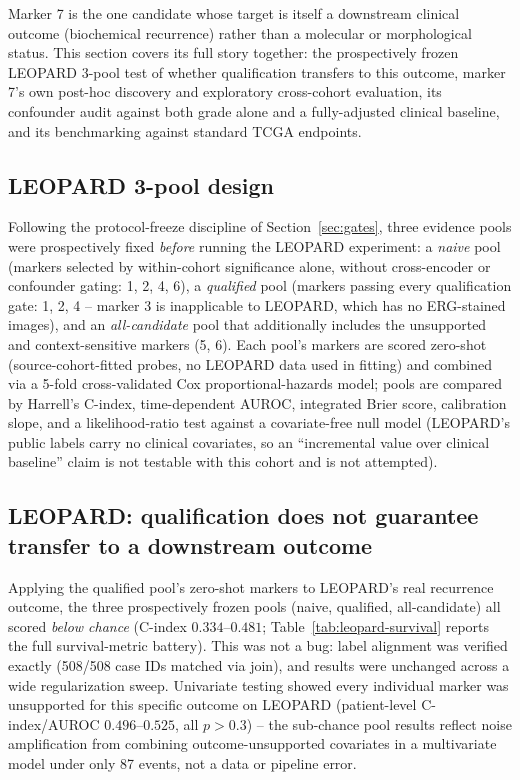\label{sec:recurrence-transfer}

Marker 7 is the one candidate whose target is itself a downstream clinical outcome
(biochemical recurrence) rather than a molecular or morphological status. This section covers
its full story together: the prospectively frozen LEOPARD 3-pool test of whether qualification
transfers to this outcome, marker 7's own post-hoc discovery and exploratory cross-cohort evaluation, its
confounder audit against both grade alone and a fully-adjusted clinical baseline, and its
benchmarking against standard TCGA endpoints.

\subsection{LEOPARD 3-pool design}
\label{sec:leopard-methods}

Following the protocol-freeze discipline of Section~\ref{sec:gates}, three evidence pools were
prospectively fixed \emph{before} running the LEOPARD experiment: a \emph{naive} pool (markers
selected by within-cohort significance alone, without cross-encoder or confounder gating: 1, 2,
4, 6), a \emph{qualified} pool (markers passing every qualification gate: 1, 2, 4 -- marker 3
is inapplicable to LEOPARD, which has no ERG-stained images), and an \emph{all-candidate} pool
that additionally includes the unsupported and context-sensitive markers (5, 6). Each pool's markers
are scored zero-shot (source-cohort-fitted probes, no LEOPARD data used in fitting) and
combined via a 5-fold cross-validated Cox proportional-hazards model; pools are compared by
Harrell's C-index, time-dependent AUROC, integrated Brier score, calibration slope, and a
likelihood-ratio test against a covariate-free null model (LEOPARD's public labels carry no
clinical covariates, so an ``incremental value over clinical baseline'' claim is not testable
with this cohort and is not attempted).

\subsection{LEOPARD: qualification does not guarantee transfer to a downstream outcome}
\label{sec:leopard-results}

Applying the qualified pool's zero-shot markers to LEOPARD's real recurrence outcome, the
three prospectively frozen pools (naive, qualified, all-candidate) all scored \emph{below chance}
(C-index $0.334$--$0.481$; Table~\ref{tab:leopard-survival} reports the full survival-metric
battery). This was not a bug: label alignment was verified exactly
(508/508 case IDs matched via join), and results were unchanged across a wide regularization
sweep. Univariate testing showed every individual marker was unsupported for this specific outcome on
LEOPARD (patient-level C-index/AUROC $0.496$--$0.525$, all $p>0.3$) -- the sub-chance pool
results reflect noise amplification from combining outcome-unsupported covariates in a multivariate model
under only 87 events, not a data or pipeline error.

